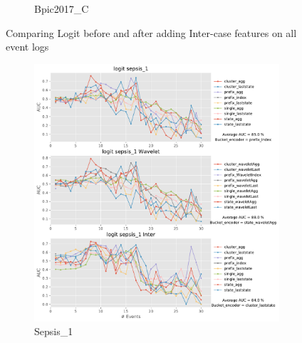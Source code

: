\documentclass[twoside,11pt]{Latex/Classes/PhDthesisPSnPDF}
\begin{document}
\begin{figure}[!htbp]
\begin{subfigure}{0.48\textwidth}
		\caption{Bpic2017\_C} \label{fig:b17ci}
	\end{subfigure}	
\caption{Comparing Logit before and after adding Inter-case features on all event logs}
\label{fig:interl1}
\end{figure}

\begin{figure}[!htbp] %
	
	\begin{subfigure}{0.48\textwidth}
		\includegraphics[width=\linewidth]{images/inter/logit/sepsis_1.pdf}
		\caption{Sepsis\_1} \label{fig:sepsisi}
	\end{subfigure}\hspace*{\fill}
	\begin{subfigure}{0.48\textwidth}

\end{subfigure}
\end{figure}
\end{document}
